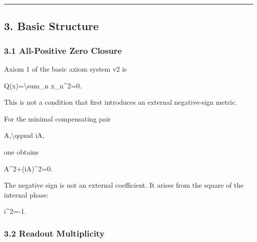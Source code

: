 \documentclass[
  a4paper,
]{article}
\newenvironment{Shaded}{}{}
\newcommand{\NormalTok}[1]{#1}
\begin{document}
\begin{center}\rule{0.5\linewidth}{0.5pt}\end{center}

\subsection{3. Basic Structure}\label{basic-structure}

\subsubsection{3.1 All-Positive Zero
Closure}\label{all-positive-zero-closure}

Axiom 1 of the basic axiom system v2 is

\begin{Shaded}
\begin{Highlighting}[]
\NormalTok{Q(x)=\textbackslash{}sum\_n x\_n\^{}2=0.}
\end{Highlighting}
\end{Shaded}

This is not a condition that first introduces an external negative-sign
metric.

For the minimal compensating pair

\begin{Shaded}
\begin{Highlighting}[]
\NormalTok{A,\textbackslash{}qquad iA,}
\end{Highlighting}
\end{Shaded}

one obtains

\begin{Shaded}
\begin{Highlighting}[]
\NormalTok{A\^{}2+(iA)\^{}2=0.}
\end{Highlighting}
\end{Shaded}

The negative sign is not an external coefficient. It arises from the
square of the internal phase:

\begin{Shaded}
\begin{Highlighting}[]
\NormalTok{i\^{}2={-}1.}
\end{Highlighting}
\end{Shaded}

\subsubsection{3.2 Readout Multiplicity}\label{readout-multiplicity}
\end{document}
